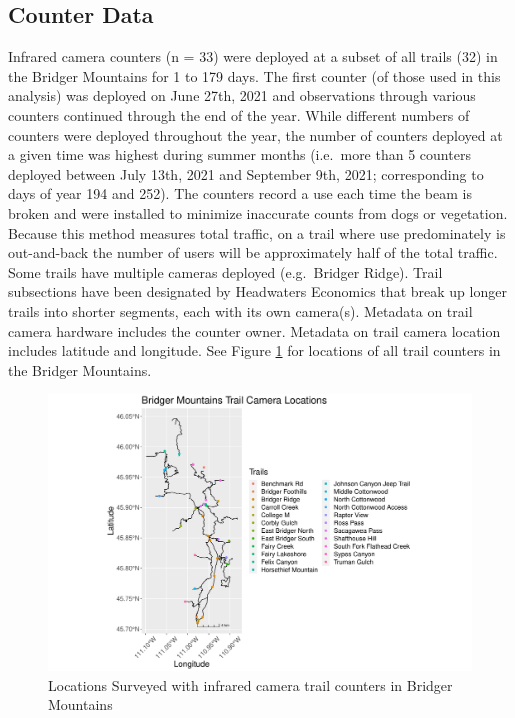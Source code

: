 \documentclass[
]{book}
\begin{document}
\hypertarget{counter-data}{%
\subsection{Counter Data}\label{counter-data}}

Infrared camera counters (n = 33)
were deployed at a subset of all trails
(32)
in the Bridger Mountains for 1
to 179 days. The first counter
(of those used in this analysis) was deployed on June 27th, 2021 and
observations through various counters continued through the end of the
year. While different numbers of counters were deployed throughout the
year, the number of counters deployed at a given time was highest during
summer months (i.e.~more than 5 counters deployed between July 13th,
2021 and September 9th, 2021; corresponding to days of year 194 and
252). The counters record a use each time the beam is broken and were
installed to minimize inaccurate counts from dogs or vegetation. Because
this method measures total traffic, on a trail where use predominately
is out-and-back the number of users will be approximately half of the
total traffic. Some trails have multiple cameras deployed (e.g.~Bridger
Ridge). Trail subsections have been designated by Headwaters Economics
that break up longer trails into shorter segments, each with its own
camera(s). Metadata on trail camera hardware includes the counter owner.
Metadata on trail camera location includes latitude and longitude. See
Figure \ref{fig:counter-locations} for locations of all trail counters
in the Bridger Mountains.

\begin{figure}

{\centering \includegraphics[width=1\linewidth]{../figures/camera_locations} 

}

\caption{Locations Surveyed with infrared camera trail counters in Bridger Mountains}\label{fig:counter-locations}
\end{figure}
\end{document}
